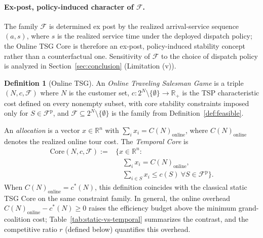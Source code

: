 \documentclass[11pt]{article}
\theoremstyle{plain}
\theoremstyle{definition}
\newtheorem{definition}[theorem]{Definition}
\theoremstyle{remark}
\newcommand{\F}{\mathcal{F}}
\newcommand{\Fp}{\mathcal{F}^{\mathrm{p}}}
\newcommand{\cstar}{c^{\ast}}
\begin{document}
\paragraph{Ex-post, policy-induced character of $\F$.} The family $\F$ is determined ex post by the realized arrival-service sequence $(a,s)$, where $s$ is the realized service time under the deployed dispatch policy; the Online TSG Core is therefore an ex-post, policy-induced stability concept rather than a counterfactual one. Sensitivity of $\F$ to the choice of dispatch policy is analyzed in Section~\ref{sec:conclusion} (Limitation (v)).

\begin{definition}[Online TSG]
\label{def:online-tsg}
An \emph{Online Traveling Salesman Game} is a triple $(N, c, \F)$ where $N$ is the customer set, $c:2^N\setminus\{\emptyset\}\to\mathbb{R}_+$ is the TSP characteristic cost defined on every nonempty subset, with core stability constraints imposed only for $S\in\Fp$, and $\F\subseteq 2^N\setminus\{\emptyset\}$ is the family from Definition~\ref{def:feasible}.
\end{definition}

An \emph{allocation} is a vector $x\in\mathbb{R}^n$ with $\sum_i x_i = C(N)_{\text{online}}$, where $C(N)_{\text{online}}$ denotes the realized online tour cost. The \emph{Temporal Core} is
\[
\begin{aligned}
\mathrm{Core}(N,c,\F) := {} & \bigl\{ x\in\mathbb{R}^n : \\
& \quad \textstyle\sum_i x_i = C(N)_{\text{online}}, \\
& \quad \textstyle\sum_{i\in S} x_i \le c(S)\ \forall S\in\Fp \bigr\}.
\end{aligned}
\]
When $C(N)_{\text{online}} = \cstar(N)$, this definition coincides with the classical \citet{potters1992tsg} static TSG Core on the same constraint family. In general, the online overhead $C(N)_{\text{online}}-\cstar(N)\ge 0$ raises the efficiency budget above the minimum grand-coalition cost; Table~\ref{tab:static-vs-temporal} summarizes the contrast, and the competitive ratio $r$ (defined below) quantifies this overhead.
\end{document}
